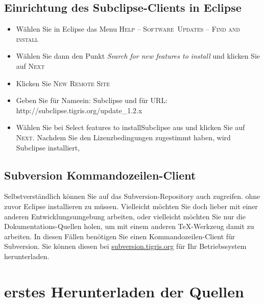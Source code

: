 \subsection{Einrichtung des Subclipse-Clients in Eclipse}
\label{subclipse}
\begin{itemize}
  \item Wählen Sie in Eclipse das Menu \textsc{Help -- Software~Updates -- Find
  and install}
  \item Wählen Sie dann den Punkt \textit{Search for new features to install} und
  klicken Sie auf \textsc{Next}
  \item Klicken Sie \textsc{New Remote Site}
  \item Geben Sie für \glq Name\grq ein: Sub\-clipse und für \glq URL\grq:
  http://subclipse.tigris.org/update\_1.2.x
  \item Wählen Sie bei \glqq Select features to install\grqq Subclipse aus und
  klicken Sie auf \textsc{Next}. Nachdem Sie den Lizenzbedingungen zugestimmt
  haben, wird Subclipse installiert,

\end{itemize}
\subsection{Subversion Kommandozeilen-Client}
\label{subversionclient}
Selbstverständlich können Sie auf das Subversion-Repository auch zugreifen. ohne
zuvor Eclipse installieren zu müssen. Vielleicht möchten Sie doch lieber mit
einer anderen Entwicklungsumgebung arbeiten, oder vielleicht möchten Sie nur die
Dokumentations-Quellen holen, um mit einem anderen \TeX-Werkzeug damit zu
arbeiten. In diesen Fällen benötigen Sie einen Kommandozeilen-Client für
Subversion. Sie können diesen bei
\href{http://subversion.tigris.org}{subversion.tigris.org} für Ihr
Betriebssystem herunterladen.

\section{erstes Herunterladen der Quellen}
